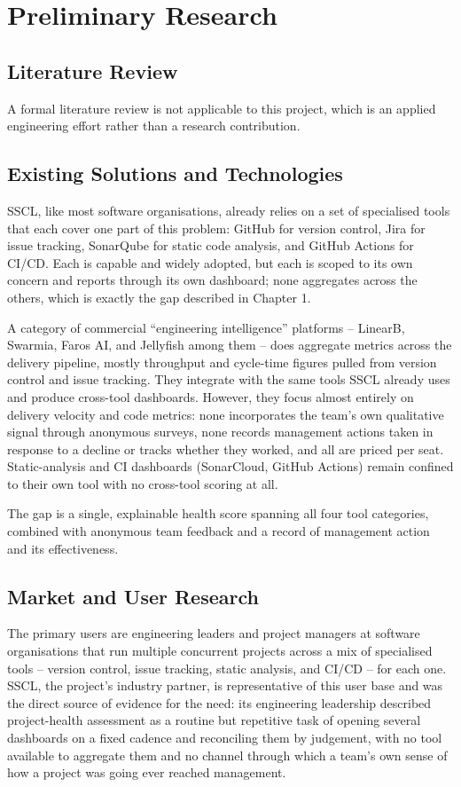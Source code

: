 \chapter{Preliminary Research}
\label{ch:research}

\section{Literature Review}
\label{sec:literature}
A formal literature review is not applicable to this project, which is an
applied engineering effort rather than a research contribution.

\section{Existing Solutions and Technologies}
\label{sec:related}
SSCL, like most software organisations, already relies on a set of
specialised tools that each cover one part of this problem: GitHub for
version control, Jira for issue tracking, SonarQube for static code
analysis, and GitHub Actions for CI/CD. Each is capable and widely adopted,
but each is scoped to its own concern and reports through its own dashboard;
none aggregates across the others, which is exactly the gap described in
Chapter 1.

A category of commercial ``engineering intelligence'' platforms --
LinearB, Swarmia, Faros AI, and Jellyfish among them -- does aggregate
metrics across the delivery pipeline, mostly throughput and cycle-time
figures pulled from version control and issue tracking. They integrate with
the same tools SSCL already uses and produce cross-tool dashboards. However,
they focus almost entirely on delivery velocity and code metrics: none
incorporates the team's own qualitative signal through anonymous surveys,
none records management actions taken in response to a decline or tracks
whether they worked, and all are priced per seat. Static-analysis and CI
dashboards (SonarCloud, GitHub Actions) remain confined to their own tool
with no cross-tool scoring at all.

The gap is a single, explainable health score spanning all four tool
categories, combined with anonymous team feedback and a record of
management action and its effectiveness.

\section{Market and User Research}
\label{sec:market}
The primary users are engineering leaders and project managers at software
organisations that run multiple concurrent projects across a mix of
specialised tools -- version control, issue tracking, static analysis, and
CI/CD -- for each one. SSCL, the project's industry partner, is
representative of this user base and was the direct source of evidence for
the need: its engineering leadership described project-health assessment as
a routine but repetitive task of opening several dashboards on a fixed
cadence and reconciling them by judgement, with no tool available to
aggregate them and no channel through which a team's own sense of how a
project was going ever reached management.

